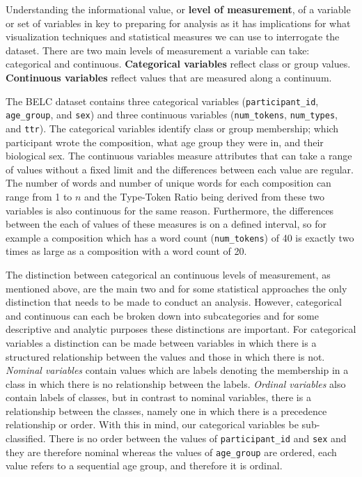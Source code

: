 \documentclass[
  letterpaper,
]{scrbook}
\begin{document}
Understanding the informational value, or \textbf{level of measurement},
of a variable or set of variables in key to preparing for analysis as it
has implications for what visualization techniques and statistical
measures we can use to interrogate the dataset. There are two main
levels of measurement a variable can take: categorical and continuous.
\textbf{Categorical variables} reflect class or group values.
\textbf{Continuous variables} reflect values that are measured along a
continuum.

The BELC dataset contains three categorical variables
(\texttt{participant\_id}, \texttt{age\_group}, and \texttt{sex}) and
three continuous variables (\texttt{num\_tokens}, \texttt{num\_types},
and \texttt{ttr}). The categorical variables identify class or group
membership; which participant wrote the composition, what age group they
were in, and their biological sex. The continuous variables measure
attributes that can take a range of values without a fixed limit and the
differences between each value are regular. The number of words and
number of unique words for each composition can range from 1 to \(n\)
and the Type-Token Ratio being derived from these two variables is also
continuous for the same reason. Furthermore, the differences between the
each of values of these measures is on a defined interval, so for
example a composition which has a word count (\texttt{num\_tokens}) of
40 is exactly two times as large as a composition with a word count of
20.

The distinction between categorical an continuous levels of measurement,
as mentioned above, are the main two and for some statistical approaches
the only distinction that needs to be made to conduct an analysis.
However, categorical and continuous can each be broken down into
subcategories and for some descriptive and analytic purposes these
distinctions are important. For categorical variables a distinction can
be made between variables in which there is a structured relationship
between the values and those in which there is not. \emph{Nominal
variables} contain values which are labels denoting the membership in a
class in which there is no relationship between the labels.
\emph{Ordinal variables} also contain labels of classes, but in contrast
to nominal variables, there is a relationship between the classes,
namely one in which there is a precedence relationship or order. With
this in mind, our categorical variables be sub-classified. There is no
order between the values of \texttt{participant\_id} and \texttt{sex}
and they are therefore nominal whereas the values of \texttt{age\_group}
are ordered, each value refers to a sequential age group, and therefore
it is ordinal.
\end{document}
